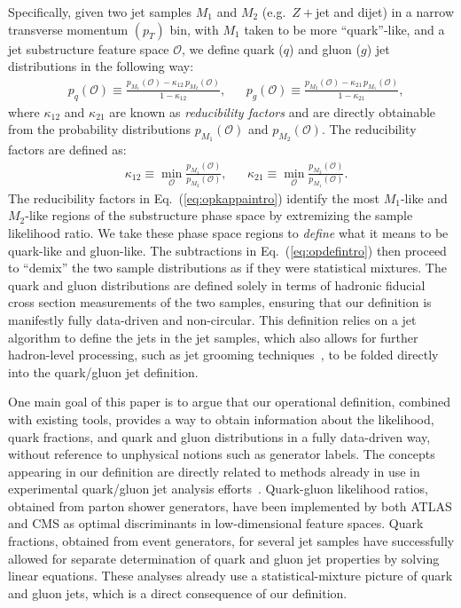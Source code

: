 \documentclass[letterpaper,11pt]{article}
\DeclareRobustCommand{\Eq}[1]{Eq.~(\ref{#1})}
\renewcommand{\O}{\mathcal{O}}
\begin{document}
Specifically, given two jet samples $M_1$ and $M_2$ (e.g.\ $Z+$jet and dijet) in a narrow transverse momentum $(p_T)$ bin, with $M_1$ taken to be more ``quark''-like, and a jet substructure feature space $\mathcal O$, we define quark ($q$) and gluon ($g$) jet distributions in the following way:
\begin{align}
\label{eq:opdefintro}
&p_q(\O)\equiv\frac{p_{M_1}(\O)-\kappa_{12}\,p_{M_2}(\O)}{1-\kappa_{12}},&&p_g(\O)\equiv\frac{p_{M_2}(\O)-\kappa_{21}\,p_{M_1}(\O)}{1-\kappa_{21}},
\end{align}
where $\kappa_{12}$ and $\kappa_{21}$ are known as \emph{reducibility factors} and are directly obtainable from the probability distributions $p_{M_1}(\O)$ and $p_{M_2}(\O)$.
%
The reducibility factors are defined as:
\begin{align}\label{eq:opkappaintro}
&\kappa_{12} \equiv \min_\mathcal O \frac{p_{M_1}(\mathcal O)}{p_{M_2}(\mathcal O)}, &&\kappa_{21} \equiv \min_\mathcal O \frac{p_{M_2}(\mathcal O)}{p_{M_1}(\mathcal O)}.
\end{align}
%
The reducibility factors in \Eq{eq:opkappaintro} identify the most $M_1$-like and $M_2$-like regions of the substructure phase space by extremizing the sample likelihood ratio.
%
We take these phase space regions to \emph{define} what it means to be quark-like and gluon-like.
%
The subtractions in \Eq{eq:opdefintro} then proceed to ``demix'' the two sample distributions as if they were statistical mixtures.
%
The quark and gluon distributions are defined solely in terms of hadronic fiducial cross section measurements of the two samples, ensuring that our definition is manifestly fully data-driven and non-circular.
%
This definition relies on a jet algorithm to define the jets in the jet samples, which also allows for further hadron-level processing, such as jet grooming techniques~\cite{Krohn:2009th,Ellis:2009me,Ellis:2009su,Dasgupta:2013ihk,Larkoski:2014wba}, to be folded directly into the quark/gluon jet definition.


One main goal of this paper is to argue that our operational definition, combined with existing tools, provides a way to obtain information about the likelihood, quark fractions, and quark and gluon distributions in a fully data-driven way, without reference to unphysical notions such as generator labels.
%
The concepts appearing in our definition are directly related to methods already in use in experimental quark/gluon jet analysis efforts~\cite{CMS-PAS-JME-13-002,Aad:2014gea,Aad:2016oit,CMS-DP-2016-070,ATL-PHYS-PUB-2017-009,Sirunyan:2018asm}.
%
Quark-gluon likelihood ratios, obtained from parton shower generators, have been implemented by both ATLAS and CMS as optimal discriminants in low-dimensional feature spaces.
%
Quark fractions, obtained from event generators, for several jet samples have successfully allowed for separate determination of quark and gluon jet properties by solving linear equations.
%
These analyses already use a statistical-mixture picture of quark and gluon jets, which is a direct consequence of our definition.
\end{document}
